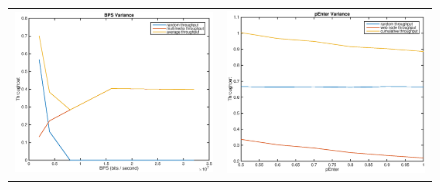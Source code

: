 \begin{figure}
\begin{tabular}{cc}
\includegraphics[scale=0.35]{../../src/fig-simulation_random_multimedia-bps-1_0_5_0_12000.eps} & \includegraphics[scale=0.35]{../../src/fig-simulation_random_web-penter-1_0_1_0_1_1_5.eps}

\end{tabular}
\end{figure}


